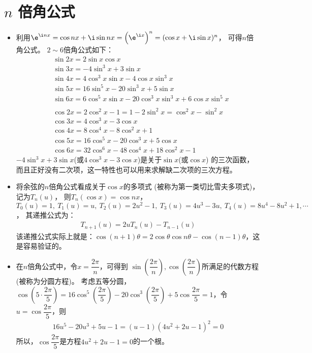 \section{$ n $ 倍角公式}
\begin{itemize}[leftmargin=\inteval{\myitemleftmargin}pt,itemsep=
   \inteval{\myitemitempsep}pt,topsep=\inteval{\myitemtopsep}pt]
\item 利用$ \e^{\i nx}=\cos nx +\i\sin nx=\left(
\e^{\i x} \right)^n =(\cos x+\i\sin x)^n $，
可得$ n $倍角公式。 $ 2\sim 6 $倍角公式如下：
\begin{align*}
    & \sin 2x=2\sin x\cos x \\    
    & \sin 3x=-4 \sin^3 x+ 3\sin x 	  \\
    & \sin 4x=4\cos^3x\sin x-4\cos x\sin^3 x  \\
    & \sin 5x=16\sin^5 x-20\sin^3 x+5 \sin x  \\
    & \sin 6x=6\cos^5 x\sin x-20\cos^3 x\sin^3 x+6\cos x \sin^5 x \\
    \\
    & \cos 2x=2\cos^2 x-1=1-2\sin^2 x=\cos^2 x- \sin^2 x  \\		
    & \cos 3x=4 \cos^3 x- 3\cos x  \\		
    & \cos 4x=8 \cos^4 x- 8\cos^2 x+1  \\		
    & \cos 5x=16\cos^5 x- 20\cos^3 x+5\cos x  \\
    & \cos 6x=32\cos^6 x-48\cos^4 x+ 18\cos^2 x-1 
\end{align*}
$ -4 \sin^3 x+ 3\sin x $(或$ 4 \cos^3 x- 3\cos x $)是关于$ \sin x $(或$ \cos x $)
的三次函数，而且正好没有二次项，这一特性也可以用来求解缺二次项的三次方程。

\item 将余弦的$ n $倍角公式看成关于$ \cos x $的多项式
(被称为第一类切比雪夫多项式)，记为$ T_n(u) $，
则$ T_n(\cos x)=\cos nx $，
$ T_0(u)=1,\ T_1(u)=u,\ T_2(u)=2u^2-1,\ T_3(u)=4u^3-3u,\ T_4(u)=8u^4-8u^2+1,\cdots $，
其递推公式为：
\begin{align}\label{车比雪夫多项式递推关系}
    T_{n+1}(u)=2uT_n(u)-T_{n-1}(u)
\end{align}
该递推公式实际上就是：$ \cos(n+1)\theta=2\cos\theta\cos n\theta-
\cos(n-1)\theta $，这是容易验证的。 

\item 在$ n $倍角公式中，令$ x=\dfrac{2\pi}{n} $，可得到
$\sin(\dfrac{2\pi}{n}),\cos(\dfrac{2\pi}{n}) $所满足的代数方程(被称为分圆方程)。
考虑五等分圆，$ \cos(5\cdot \dfrac{2\pi}{5})=16\cos^5(\dfrac{2\pi}{5})- 20\cos^3 (\dfrac{2\pi}{5})+
5\cos \dfrac{2\pi}{5}=1 $，令$ u=\cos \dfrac{2\pi}{5} $，则
\begin{align*}
    16u^5-20u^3+5u-1=(u-1)(4u^2+2u-1)^2=0
\end{align*}
所以，$ \cos \dfrac{2\pi}{5} $是方程$ 4u^2+2u-1=0 $的一个根。


\end{itemize}
